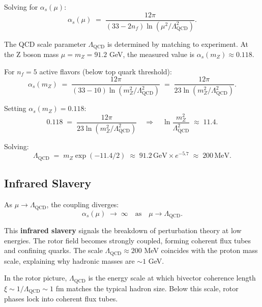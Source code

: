 \documentclass[11pt,a4paper]{article}
\theoremstyle{definition}
\theoremstyle{plain}
\theoremstyle{remark}
\begin{document}
Solving for $\alpha_s(\mu)$:
\begin{equation}
\alpha_s(\mu) \;=\; \frac{12\pi}{(33 - 2n_f)\ln(\mu^2/\Lambda_{\mathrm{QCD}}^2)}.
\label{eq:running-coupling}
\end{equation}

The QCD scale parameter $\Lambda_{\mathrm{QCD}}$ is determined by matching to experiment. At the Z boson mass $\mu = m_Z = 91.2$ GeV, the measured value is $\alpha_s(m_Z) \approx 0.118$.

For $n_f = 5$ active flavors (below top quark threshold):
\begin{equation}
\alpha_s(m_Z) \;=\; \frac{12\pi}{(33 - 10)\ln(m_Z^2/\Lambda_{\mathrm{QCD}}^2)} \;=\; \frac{12\pi}{23\ln(m_Z^2/\Lambda_{\mathrm{QCD}}^2)}.
\end{equation}

Setting $\alpha_s(m_Z) = 0.118$:
\begin{equation}
0.118 \;=\; \frac{12\pi}{23\ln(m_Z^2/\Lambda_{\mathrm{QCD}}^2)} \quad\Rightarrow\quad \ln\frac{m_Z^2}{\Lambda_{\mathrm{QCD}}^2} \;\approx\; 11.4.
\end{equation}

Solving:
\begin{equation}
\Lambda_{\mathrm{QCD}} \;=\; m_Z \exp(-11.4/2) \;\approx\; 91.2\,\text{GeV} \times e^{-5.7} \;\approx\; \boxed{200\,\text{MeV}.}
\label{eq:lambda-qcd}
\end{equation}

\subsection{Infrared Slavery}

As $\mu \to \Lambda_{\mathrm{QCD}}$, the coupling diverges:
\begin{equation}
\alpha_s(\mu) \;\to\; \infty \quad\text{as}\quad \mu \to \Lambda_{\mathrm{QCD}}.
\end{equation}

This \textbf{infrared slavery} signals the breakdown of perturbation theory at low energies. The rotor field becomes strongly coupled, forming coherent flux tubes and confining quarks. The scale $\Lambda_{\mathrm{QCD}} \approx 200$ MeV coincides with the proton mass scale, explaining why hadronic masses are $\sim 1$ GeV.

In the rotor picture, $\Lambda_{\mathrm{QCD}}$ is the energy scale at which bivector coherence length $\xi \sim 1/\Lambda_{\mathrm{QCD}} \sim 1$ fm matches the typical hadron size. Below this scale, rotor phases lock into coherent flux tubes.
\end{document}
